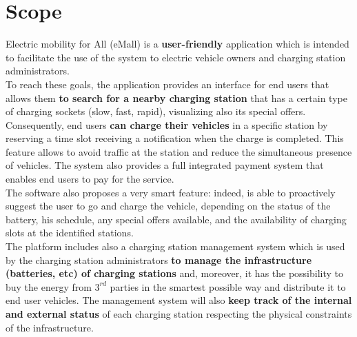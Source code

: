 \section{Scope}
Electric mobility for All (eMall) is a \textbf{user-friendly} application which is intended to facilitate the use of the system to electric vehicle owners and charging station administrators.\\
To reach these goals, the application provides an interface for end users that allows them \textbf{to search for a nearby charging station} that has a certain type of charging sockets (slow, fast, rapid), visualizing also its special offers. Consequently, end users \textbf{can charge their vehicles} in a specific station by reserving a time slot receiving a notification when the charge is completed. This feature allows to avoid traffic at the station and reduce the simultaneous presence of vehicles. The system also provides a full integrated payment system that enables end users to pay for the service.\\
The software also proposes a very smart feature: indeed, is able to proactively suggest the user to go and charge the vehicle, depending on the status of the
battery, his schedule, any special offers available, and the availability of charging slots at the identified stations.\\
The platform includes also a charging station management system which is used by the charging station administrators \textbf{to manage the infrastructure (batteries, etc) of charging stations} and, moreover, it has the possibility to buy the energy from $3^{rd}$ parties in the smartest possible way and distribute it to end user vehicles. The management system will also \textbf{keep track of the internal and external status} of each charging station respecting the physical constraints of the infrastructure.
